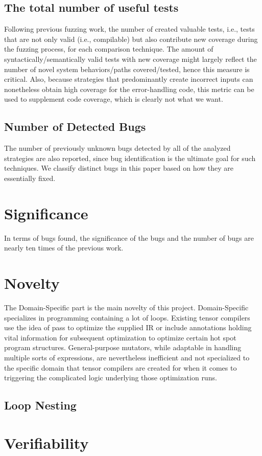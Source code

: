 \documentclass[conference]{IEEEtran}
\begin{document}
\subsection{The total number of useful tests} Following previous fuzzing work,  the number of created valuable tests, i.e., tests that are not only valid (i.e., compilable) but also contribute new coverage during the fuzzing process, for each comparison technique. The amount of syntactically/semantically valid tests with new coverage might largely reflect the number of novel system behaviors/paths covered/tested, hence this measure is critical. Also, because strategies that predominantly create incorrect inputs can nonetheless obtain high coverage for the error-handling code, this metric can be used to supplement code coverage, which is clearly not what we want.
\subsection{Number of Detected Bugs}  The number of previously unknown bugs detected by all of the analyzed strategies are also reported, since bug identification is the ultimate goal for such techniques. We classify distinct bugs in this paper based on how they are essentially fixed.
\section{Significance}
In terms of bugs found, the significance of the bugs and the number of bugs are nearly ten times of the previous work.
\section{Novelty}
The Domain-Specific part is the main novelty of this project. Domain-Specific specializes in programming containing a lot of loops. Existing tensor compilers use the idea of pass to optimize the supplied IR or include annotations holding vital information for subsequent optimization to optimize certain hot spot program structures. General-purpose mutators, while adaptable in handling multiple sorts of expressions, are nevertheless inefficient and not specialized to the specific domain that tensor compilers are created for when it comes to triggering the complicated logic underlying those optimization runs.
\subsection{Loop Nesting}

\section{Verifiability}
\end{document}
